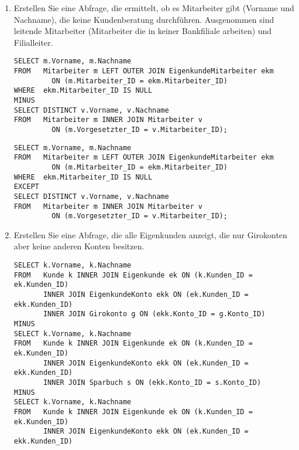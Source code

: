 \begin{enumerate}
\begin{lstlisting}[language=oracle_sql]
        \end{lstlisting}
\clearpage
        \item Erstellen Sie eine Abfrage, die ermittelt, ob es Mitarbeiter gibt
        (Vorname und Nachname), die keine Kundenberatung durchf\"uhren.
        Ausgenommen sind leitende Mitarbeiter (Mitarbeiter die in keiner
        Bankfiliale arbeiten) und Filialleiter.
        \begin{oraclesql}[\FALSE]
        \end{oraclesql}
        \begin{lstlisting}[language=oracle_sql]
SELECT m.Vorname, m.Nachname
FROM   Mitarbeiter m LEFT OUTER JOIN EigenkundeMitarbeiter ekm
         ON (m.Mitarbeiter_ID = ekm.Mitarbeiter_ID)
WHERE  ekm.Mitarbeiter_ID IS NULL
MINUS
SELECT DISTINCT v.Vorname, v.Nachname
FROM   Mitarbeiter m INNER JOIN Mitarbeiter v
         ON (m.Vorgesetzter_ID = v.Mitarbeiter_ID);
        \end{lstlisting}
        \begin{mssql}[\FALSE]
        \end{mssql}
        \begin{lstlisting}[language=ms_sql]
SELECT m.Vorname, m.Nachname
FROM   Mitarbeiter m LEFT OUTER JOIN EigenkundeMitarbeiter ekm
         ON (m.Mitarbeiter_ID = ekm.Mitarbeiter_ID)
WHERE  ekm.Mitarbeiter_ID IS NULL
EXCEPT
SELECT DISTINCT v.Vorname, v.Nachname
FROM   Mitarbeiter m INNER JOIN Mitarbeiter v
         ON (m.Vorgesetzter_ID = v.Mitarbeiter_ID);
        \end{lstlisting}
        \item Erstellen Sie eine Abfrage, die alle Eigenkunden anzeigt, die nur
        Girokonten aber keine anderen Konten besitzen.
        \begin{oraclesql}[\FALSE]
        \end{oraclesql}
        \begin{lstlisting}[language=oracle_sql]
SELECT k.Vorname, k.Nachname
FROM   Kunde k INNER JOIN Eigenkunde ek ON (k.Kunden_ID = ek.Kunden_ID)
       INNER JOIN EigenkundeKonto ekk ON (ek.Kunden_ID = ekk.Kunden_ID)
       INNER JOIN Girokonto g ON (ekk.Konto_ID = g.Konto_ID)
MINUS
SELECT k.Vorname, k.Nachname
FROM   Kunde k INNER JOIN Eigenkunde ek ON (k.Kunden_ID = ek.Kunden_ID)
       INNER JOIN EigenkundeKonto ekk ON (ek.Kunden_ID = ekk.Kunden_ID)
       INNER JOIN Sparbuch s ON (ekk.Konto_ID = s.Konto_ID)
MINUS
SELECT k.Vorname, k.Nachname
FROM   Kunde k INNER JOIN Eigenkunde ek ON (k.Kunden_ID = ek.Kunden_ID)
       INNER JOIN EigenkundeKonto ekk ON (ek.Kunden_ID = ekk.Kunden_ID)

\end{lstlisting}
\end{enumerate}
